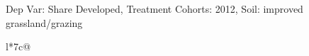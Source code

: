 \begin{table}[H]
\captionlistentry[table]{}
\label{table:beaver_land_class_DVis_land_class_3_SCg1_SSIGRG}
\scriptsize %
Dep Var: Share Developed, Treatment Cohorts: 2012, Soil: improved grassland/grazing \\
\begin{threeparttable}
\begin{tabulary}{\textwidth}{l*{7}{c}@{}}
\toprule \toprule
\noalign{\smallskip}
\noalign{\smallskip}
\midrule \bottomrule
\end{tabulary}
\medskip
\end{threeparttable}
\end{table}
